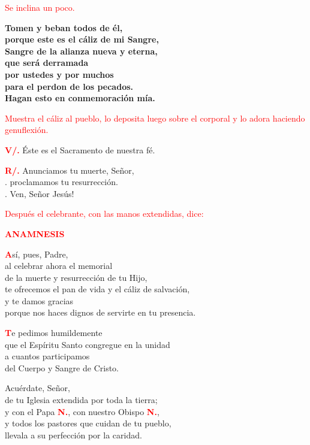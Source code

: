 \documentclass[12pt, letterpaper]{report}
\begin{document}
\large{\textcolor{red}{Se inclina un poco.}}

\noindent
\LARGE{ \bfseries{ Tomen y beban todos de \'el,\\
porque este es el c\'aliz de mi Sangre,\\
Sangre de la alianza nueva y eterna,\\
que ser\'a derramada\\
por ustedes y por muchos\\
para el perdon de los pecados.\\
Hagan esto en conmemoraci\'on m\'ia.}}

\large{\textcolor{red}{Muestra el c\'aliz al pueblo, lo deposita luego sobre el corporal y lo adora haciendo genuflexi\'on.}}

\Large {\bfseries \textcolor{red}{V/.}} \hspace{0.5cm} \'Este es el Sacramento de nuestra f\'e.

\Large {\bfseries \textcolor{red}{R/.}} \hspace{0.5cm} Anunciamos tu muerte, Se\~nor,\\
. \hspace{1.5cm} proclamamos tu resurrecci\'on.\\
. \hspace{1.5cm} Ven, Se\~nor Jes\'us!

\large{\textcolor{red}{Despu\'es el celebrante, con las manos extendidas, dice:}} 

\Large {\bfseries \textcolor{red}{ANAMNESIS}}

\lettrine[lines=1]{\bfseries \textcolor{red}{A}}{}\Large s\'i, pues, Padre,\\
al celebrar ahora el memorial\\
de la muerte y resurrecci\'on de tu Hijo,\\
te ofrecemos el pan de vida y el c\'aliz de salvaci\'on,\\
y te damos gracias\\
porque nos haces dignos de servirte en tu presencia.

\lettrine[lines=1]{\bfseries \textcolor{red}{T}}{}\Large e pedimos humildemente\\
que el Esp\'iritu Santo congregue en la unidad\\
a cuantos participamos\\
del Cuerpo y Sangre de Cristo.

\noindent
Acu\'erdate, Se\~nor,\\
de tu Iglesia extendida por toda la tierra; \\
y con el Papa {\bfseries \textcolor{red}{N.}}, con nuestro Obispo {\bfseries \textcolor{red}{N.}},\\
y todos los pastores que cuidan de tu pueblo,\\
llevala a su perfecci\'on por la caridad.
\end{document}
